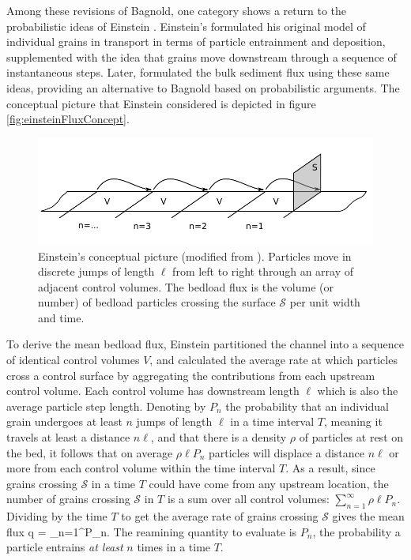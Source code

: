Among these revisions of Bagnold, one category shows a return to the probabilistic ideas of Einstein \citep{Parker2003,Ancey2006}.
Einstein's formulated his original model of individual grains in transport \citep{Einstein1937} in terms of particle entrainment and deposition, supplemented with the idea that grains move downstream through a sequence of instantaneous steps.
Later, \citet{Einstein1942,Einstein1950} formulated the bulk sediment flux using these same ideas, providing an alternative to Bagnold based on probabilistic arguments.
The conceptual picture that Einstein considered is depicted in figure \ref{fig:einsteinFluxConcept}.
 \begin{figure}[!htbp]
	\includegraphics[width=\linewidth,keepaspectratio]{./figures/ch1/yalinDrawing.pdf}
	\caption{Einstein’s conceptual picture (modified from \citet{Yalin1972}). Particles move in discrete jumps of length $\ell$ from
left to right through an array of adjacent control volumes. The bedload flux is the volume (or number) of bedload particles crossing
the surface $\mathcal{S}$ per unit width and time.}
	\label{fig:lislefig}
\end{figure}

To derive the mean bedload flux, Einstein partitioned the channel into a sequence of identical control volumes $V$, and calculated the average rate at which particles cross a control surface by aggregating the contributions from each upstream control volume.
Each control volume has downstream length $\ell$ which is also the average particle step length.
Denoting by $P_n$ the probability that an individual grain undergoes at least $n$ jumps of length $\ell$ in a time interval $T$, meaning it travels at least a distance $n \ell$, and that there is a density $\rho$ of particles at rest on the bed, it follows that on average $\rho \ell P_n$ particles will displace a distance $n \ell$ or more from each control volume within the time interval $T$. 
As a result, since grains crossing $\mathcal{S}$ in a time $T$ could have come from any upstream location, the number of grains crossing $\mathcal{S}$ in $T$ is a sum over all control volumes: $\sum_{n=1}^\infty \rho \ell P_n$.
Dividing by the time $T$ to get the average rate of grains crossing $\mathcal{S}$ gives the mean flux
\be q =  \sum_{n=1}^\infty P_n. \label{eq:einflux} \ee
The reamining quantity to evaluate is $P_n$, the probability a particle entrains \textit{at least} $n$ times in a time $T$.

